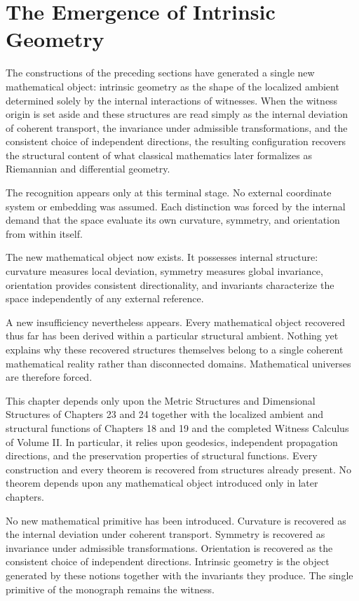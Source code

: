 \documentclass[12pt,anyside]{book}
\begin{document}
\section{The Emergence of Intrinsic Geometry}
The constructions of the preceding sections have generated a single new mathematical object: intrinsic geometry as the shape of the localized ambient determined solely by the internal interactions of witnesses. When the witness origin is set aside and these structures are read simply as the internal deviation of coherent transport, the invariance under admissible transformations, and the consistent choice of independent directions, the resulting configuration recovers the structural content of what classical mathematics later formalizes as Riemannian and differential geometry.

The recognition appears only at this terminal stage. No external coordinate system or embedding was assumed. Each distinction was forced by the internal demand that the space evaluate its own curvature, symmetry, and orientation from within itself.

The new mathematical object now exists. It possesses internal structure: curvature measures local deviation, symmetry measures global invariance, orientation provides consistent directionality, and invariants characterize the space independently of any external reference.

A new insufficiency nevertheless appears. Every mathematical object recovered thus far has been derived within a particular structural ambient. Nothing yet explains why these recovered structures themselves belong to a single coherent mathematical reality rather than disconnected domains. Mathematical universes are therefore forced.

\begin{dependencyaudit}
This chapter depends only upon the Metric Structures and Dimensional Structures of Chapters 23 and 24 together with the localized ambient and structural functions of Chapters 18 and 19 and the completed Witness Calculus of Volume II. In particular, it relies upon geodesics, independent propagation directions, and the preservation properties of structural functions. Every construction and every theorem is recovered from structures already present. No theorem depends upon any mathematical object introduced only in later chapters.
\end{dependencyaudit}

\begin{primitiveaudit}
No new mathematical primitive has been introduced. Curvature is recovered as the internal deviation under coherent transport. Symmetry is recovered as invariance under admissible transformations. Orientation is recovered as the consistent choice of independent directions. Intrinsic geometry is the object generated by these notions together with the invariants they produce. The single primitive of the monograph remains the witness.
\end{primitiveaudit}
\end{document}
